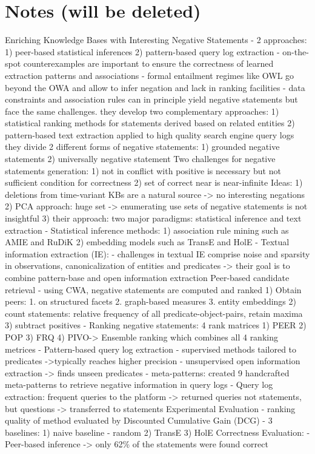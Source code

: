 \chapter{Notes (will be deleted)}

\cite{arnaout2020enriching}
Enriching Knowledge Bases with Interesting Negative Statements
- 2 approaches:
1) peer-based statistical inferences
2) pattern-based query log extraction
- on-the-spot counterexamples are important to ensure the correctness of learned extraction patterns and associations
- formal entailment regimes like OWL go beyond the OWA and allow to infer negation and lack in ranking facilities
- data constraints and association rules can in principle yield negative statements but face the same challenges.
they develop two complementary approaches:
    1) statistical ranking methods for statements derived based on related entities
    2) pattern-based text extraction applied to high quality search engine query logs
they divide 2 different forms of negative statements:
    1) grounded negative statements
    2) universally negative statement
Two challenges for negative statements generation:
    1) not in conflict with positive is necessary but not sufficient condition for correctness
    2) set of correct near is near-infinite
Ideas:
    1) deletions from time-variant KBs are a natural source -> no interesting negations
    2) PCA approach: huge set -> enumerating use sets of negative statements is not insightful
    3) their approach: two major paradigms: statistical inference and text extraction
- Statistical inference methods: 
    1) association rule mining such as AMIE and RuDiK
    2) embedding models such as TransE and HolE
- Textual information extraction (IE):
    - challenges in textual IE comprise noise and sparsity in observations, canonicalization of entities and predicates
    -> their goal is to combine pattern-base and open information extraction
Peer-based candidate retrieval
- using CWA, negative statements are computed and ranked
    1) Obtain peers: 1. on structured facets 2. graph-based measures 3. entity embeddings
    2) count statements: relative frequency of all predicate-object-pairs, retain maxima
    3) subtract positives
- Ranking negative statements: 4 rank matrices
    1) PEER 2) POP 3) FRQ 4) PIVO-> Ensemble ranking which combines all 4 ranking metrices
- Pattern-based query log extraction
    - supervised methods tailored to predicates ->typically reaches higher precision
    - unsupervised open information extraction -> finds unseen predicates
    - meta-patterns: created 9 handcrafted meta-patterns to retrieve negative information in query logs
    - Query log extraction: frequent queries to the platform -> returned queries not statements, but questions -> transferred to statements
Experimental Evaluation
- ranking quality of method evaluated by Discounted Cumulative Gain (DCG)
- 3 baselines: 1) naive baseline - random 2) TransE 3) HolE
Correctness Evaluation:
- Peer-based inference
    -> only 62\% of the statements were found correct

